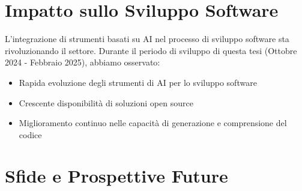 \documentclass[12pt,a4paper,openright,twoside]{book}
\begin{document}
\section{Impatto sullo Sviluppo Software}
L'integrazione di strumenti basati su AI nel processo di sviluppo software sta rivoluzionando il settore. Durante il periodo di sviluppo di questa tesi (Ottobre 2024 - Febbraio 2025), abbiamo osservato:
\begin{itemize}
    \item Rapida evoluzione degli strumenti di AI per lo sviluppo software
    \item Crescente disponibilità di soluzioni open source
    \item Miglioramento continuo nelle capacità di generazione e comprensione del codice
\end{itemize}

\section{Sfide e Prospettive Future}


%



\backmatter

\nocite{*} %


%

\end{document}
